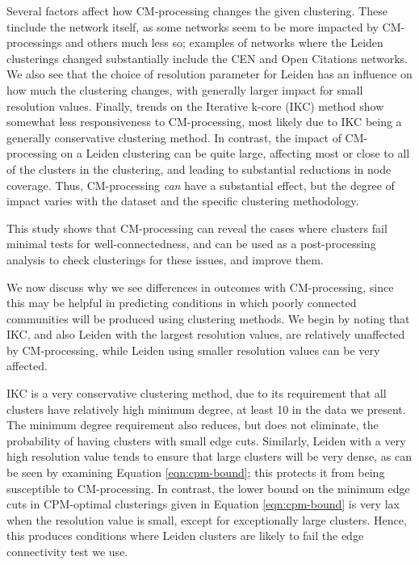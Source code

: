 \documentclass[11pt]{article}   	%
\begin{document}
Several factors affect how CM-processing changes the given clustering.  These tinclude the network itself, as some networks seem to be more impacted by CM-processings and others much less so; examples of networks where the Leiden clusterings changed substantially include the CEN and Open Citations networks. We also see that the choice of  resolution parameter for Leiden has an influence on how much the clustering changes, with generally larger impact for small resolution values.  Finally, trends on the Iterative k-core (IKC) method show somewhat less responsiveness to CM-processing, most likely due to IKC being a generally conservative clustering method.  In contrast, the impact of CM-processing on a Leiden clustering can be quite large, affecting most or close to all of the clusters in the clustering, and leading  to substantial reductions in node coverage. Thus, CM-processing {\em can} have a substantial effect, but the degree of impact varies with the dataset and the specific clustering methodology.

This study shows that  CM-processing can reveal the cases where clusters fail minimal tests for well-connectedness, and can be used as a post-processing analysis to check clusterings for these issues, and improve them.

We now discuss why we see differences in outcomes with CM-processing, since this may be helpful in predicting conditions in which poorly connected communities will be produced using clustering methods.
We begin by noting that IKC, and also Leiden with the largest resolution values, are relatively unaffected by CM-processing, while Leiden using smaller resolution values can be very affected.

IKC is a very conservative clustering method, due to its requirement that all clusters have relatively high minimum degree, at least 10 in the data we present. The minimum degree requirement also reduces, but does not eliminate, the probability of having clusters with small edge cuts. Similarly, Leiden with a very high resolution value tends to ensure that large clusters will be very dense, as can be seen by examining Equation \ref{eqn:cpm-bound}; this   protects it from being susceptible to CM-processing.  In contrast, the lower bound on the minimum edge cuts in CPM-optimal clusterings given in Equation \ref{eqn:cpm-bound} is very lax when the resolution value is small, except for exceptionally large clusters. Hence, this produces conditions where Leiden clusters are likely to fail the edge connectivity test we use.
\end{document}
